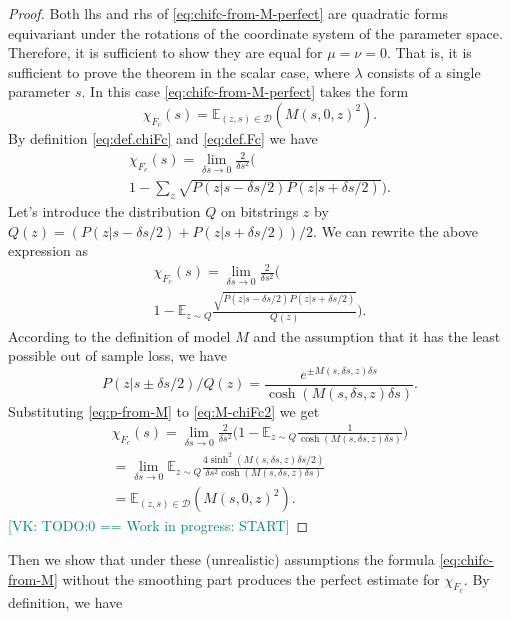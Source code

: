 \documentclass[american,aps,pra,reprint,floatfix,nofootinbib,superscriptaddress]{revtex4-2}
\newcommand{\VK}[1]{\textcolor{teal}{[VK: #1]}}
\begin{document}
\begin{proof}
  Both lhs and rhs of \eqref{eq:chifc-from-M-perfect} are 
  quadratic forms equivariant under the rotations of the 
  coordinate system of the parameter space. Therefore,
  it is sufficient to show they are equal for $\mu = \nu = 0$.
  That is, it is sufficient to prove the theorem in the scalar 
  case, where $\lambda$ consists of a single parameter $s$.
  In this case \eqref{eq:chifc-from-M-perfect} takes the form
  \begin{equation}
      \label{eq:chifc-from-M-perfect-s}
      \chi_{F_c}(s) =
        \mathbb{E}_{(z, s) \in \mathcal{D}} \left(
        M(s, 0, z)^2\right).
  \end{equation}
  By definition \eqref{eq:def.chiFc} and \eqref{eq:def.Fc} we
  have
  \begin{multline}
    \chi_{F_c}(s) = \lim_{\delta s \to 0} \frac{2}{\delta s^2}
    \Biggl(\\
      1-\sum_{z} \sqrt{P(z|s - \delta s / 2) P(z|s+\delta s/2)}
    \Biggr).
  \end{multline}
  Let's introduce the distribution $Q$ on bitstrings $z$
  by $Q(z) = (P(z|s - \delta s / 2) + P(z|s+\delta s/2)) / 2$.
  We can rewrite the above expression as
  \begin{multline}
    \label{eq:M-chiFc2}
    \chi_{F_c}(s) = \lim_{\delta s \to 0} \frac{2}{\delta s^2}
    \Biggl(\\
      1-\mathbb{E}_{z \sim Q} \frac{
          \sqrt{P(z|s - \delta s / 2) P(z|s+\delta s/2)}
        }{Q(z)}
    \Biggr).
  \end{multline}
  According to the definition of model $M$ and the assumption that
  it has the least possible out of sample loss,
  we have
  \begin{equation}
    \label{eq:p-from-M}
    P(z|s\pm \delta s / 2) / Q(z) =
      \frac{e^{\pm M(s, \delta s, z) \delta s}}{
        \cosh(M(s, \delta s, z) \delta s)
      }.
  \end{equation}
  Substituting \eqref{eq:p-from-M} to \eqref{eq:M-chiFc2} we get
  \begin{multline}
    \label{eq:M-chiFc3}
    \chi_{F_c}(s) = \lim_{\delta s \to 0} \frac{2}{\delta s^2}
    \Biggl(
      1-\mathbb{E}_{z \sim Q} \frac{1
        }{\cosh(M(s, \delta s, z) \delta s)}
    \Biggr) \\
    = \lim_{\delta s \to 0}
      \mathbb{E}_{z \sim Q} \frac{
          4\sinh^2(M(s, \delta s, z) \delta s/2)
        }{\delta s^2\cosh(M(s, \delta s, z) \delta s)}\\
    = \mathbb{E}_{(z, s) \in \mathcal{D}}\left(M(s, 0, z)^2\right).
  \end{multline}
  \VK{TODO:0 == Work in progress: START}
\end{proof}
Then we show that under these (unrealistic) assumptions
the formula \eqref{eq:chifc-from-M}
without the smoothing part produces the perfect estimate for $\chi_{F_c}$.
By definition, we have
\end{document}
